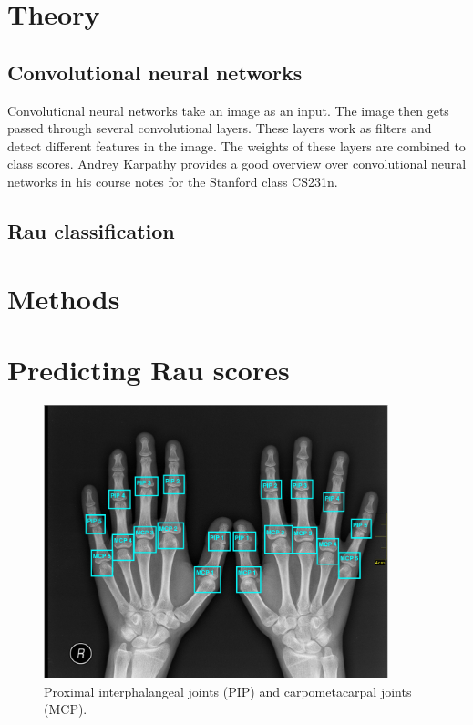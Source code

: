 \documentclass[12pt]{article}
\begin{document}
\newpage




\section{Theory}
\label{sec:theory}

\subsection{Convolutional neural networks}
\label{subsec:cnn}
Convolutional neural networks take an image as an input. The image then gets passed through several convolutional layers. These layers work as filters and detect different features in the image. The weights of these layers are combined to class scores. Andrey Karpathy provides a good overview over convolutional neural networks in his course notes for the Stanford class CS231n. \cite{cnn}

\subsection{Rau classification}
\label{subsec:rau}

\section{Methods}
\label{sec:methods}


\section{Predicting Rau scores}





\begin{figure}
\includegraphics[width=10cm]{joints}	
\caption{Proximal interphalangeal joints (PIP) and carpometacarpal joints (MCP).}
\label{fig:joints}
\end{figure}
\end{document}
